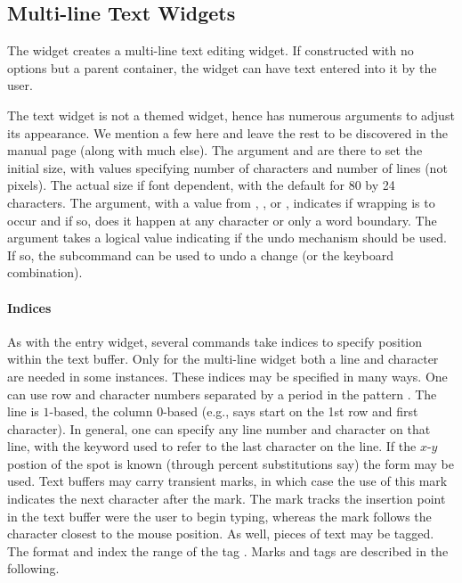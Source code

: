 \subsection{Multi-line Text Widgets}
\label{sec:tcltk:multi-line-text}


The  widget creates a multi-line text editing widget. If constructed with no options but a parent container, the widget can have text entered into it by the user. 

The text widget is not a themed widget, hence has numerous arguments to adjust its appearance. We mention a few here and leave the rest to be discovered in the manual page (along with much else). The argument  and  are there to set the initial size, with values specifying number of characters and number of lines (not pixels). The actual size if font dependent, with the default for 80 by 24 characters. The   argument, with a value from , , or , indicates if wrapping is to occur and if so, does it happen at any character or only a word boundary. The argument  takes a logical value indicating if the undo mechanism should be used. If so, the subcommand  can be used to undo a change (or the  keyboard combination).

\paragraph{Indices}
As with the entry widget, several commands take indices to specify
position within the text buffer. Only for the multi-line widget both a
line and character are needed in some instances. These indices may be
specified in many ways. One can use row and character numbers
separated by a period in the pattern . The line is
$1$-based, the column $0$-based (e.g.,  says start on the
1st row and first character). In general, one can specify any line
number and character on that line, with the keyword  used to
refer to the last character on the line. If the $x$-$y$ postion of the
spot is known (through percent substitutions say) the form
 may be used. Text buffers may carry transient marks, in
which case the use of this mark indicates the next character after the
mark. The mark  tracks the insertion point in the text
buffer were the user to begin typing, whereas the mark  follows the character closest to the mouse position. As well, pieces of text may be
tagged. The format  and  index the
range of the tag . Marks and tags are described in the
following.

